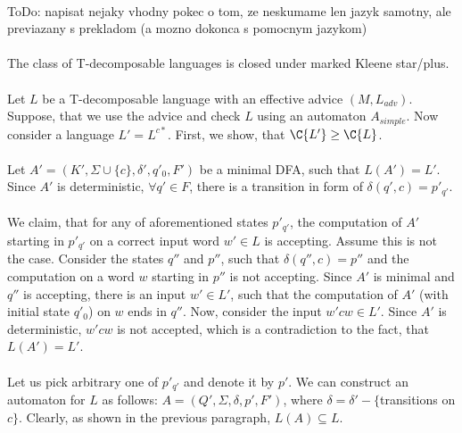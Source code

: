 \paragraph{}
\color{red}ToDo: napisat nejaky vhodny pokec o tom, ze neskumame len jazyk samotny, ale previazany s prekladom (a mozno dokonca s pomocnym jazykom)\color{black}

\paragraph{}
\cveta The class of T-decomposable languages is closed under marked Kleene star/plus.

\paragraph{}
\dokaz Let $L$ be a T-decomposable language with an effective advice $(M, L_{adv})$. Suppose, that we use the advice and check $L$ using an automaton $A_{simple}$. Now consider a language $L' = L^{c*}$. First, we show, that $\C{L'} \geq \C{L}$.

\paragraph{}
Let $A' = (K', \Sigma \cup \{c\}, \delta', q'_0, F')$ be a minimal DFA, such that $L(A') = L'$. Since $A'$ is deterministic, $\forall q' \in F$, there is a transition in form of $\delta(q', c) = p'_{q'}$. 

\paragraph{}
We claim, that for any of aforementioned states $p'_{q'}$, the computation of $A'$ starting in $p'_{q'}$ on a correct input word $w' \in L$ is accepting. Assume this is not the case. Consider the states $q''$ and $p''$, such that $\delta(q'', c) = p''$ and the computation on a word $w$ starting in $p''$ is not accepting. Since $A'$ is minimal and $q''$ is accepting, there is an input $w' \in L'$, such that the computation of $A'$ (with initial state $q'_{0}$) on $w$ ends in $q''$. Now, consider the input $w'cw \in L'$. Since $A'$ is deterministic, $w'cw$ is not accepted, which is a contradiction to the fact, that $L(A') = L'$.


\paragraph{}
Let us pick arbitrary one of $p'_{q'}$ and denote it by $p'$. We can construct an automaton for $L$ as follows: $A = (Q', \Sigma,\delta, \allowbreak p',  F')$, where $\delta = \delta' - \{$transitions on $c \}$. Clearly, as shown in the previous paragraph, $L(A) \subseteq L$. 

